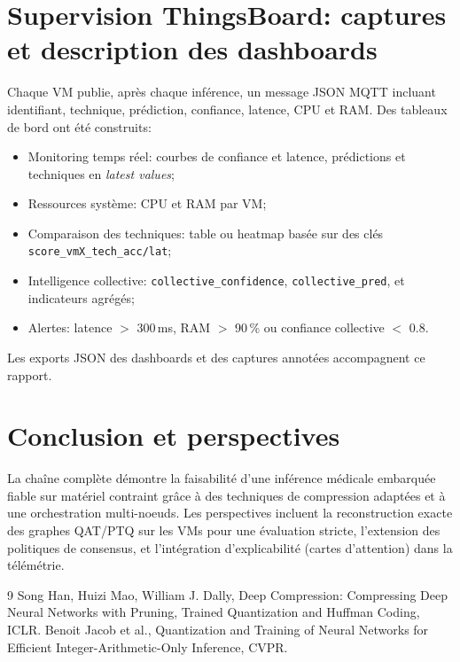 \documentclass[11pt,a4paper]{article}
\begin{document}
\section{Supervision ThingsBoard: captures et description des dashboards}
Chaque VM publie, après chaque inférence, un message JSON MQTT incluant identifiant, technique, prédiction, confiance, latence, CPU et RAM. Des tableaux de bord ont été construits:
\begin{itemize}
  \item Monitoring temps réel: courbes de confiance et latence, prédictions et techniques en \emph{latest values};
  \item Ressources système: CPU et RAM par VM;
  \item Comparaison des techniques: table ou heatmap basée sur des clés \texttt{score\_vmX\_tech\_acc/lat};
  \item Intelligence collective: \texttt{collective\_confidence}, \texttt{collective\_pred}, et indicateurs agrégés;
  \item Alertes: latence \(>\) 300\,ms, RAM \(>\) 90\,\% ou confiance collective \(<\) 0.8.
\end{itemize}
Les exports JSON des dashboards et des captures annotées accompagnent ce rapport.

\section{Conclusion et perspectives}
La chaîne complète démontre la faisabilité d'une inférence médicale embarquée fiable sur matériel contraint grâce à des techniques de compression adaptées et à une orchestration multi-noeuds. Les perspectives incluent la reconstruction exacte des graphes QAT/PTQ sur les VMs pour une évaluation stricte, l'extension des politiques de consensus, et l'intégration d'explicabilité (cartes d'attention) dans la télémétrie.

\begin{thebibliography}{9}
Song Han, Huizi Mao, William J. Dally, Deep Compression: Compressing Deep Neural Networks with Pruning, Trained Quantization and Huffman Coding, ICLR.
Benoit Jacob et al., Quantization and Training of Neural Networks for Efficient Integer-Arithmetic-Only Inference, CVPR.
\end{thebibliography}
\end{document}
